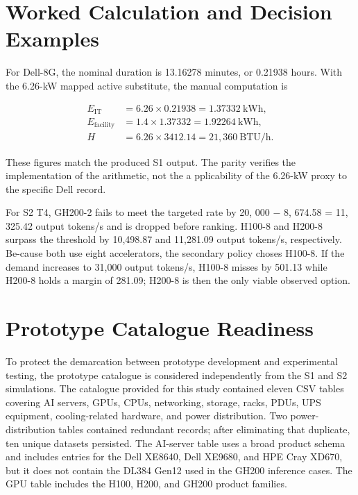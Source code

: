 \documentclass[final,3p,12pt,nopreprintline]{elsarticle}
\begin{document}
\section{Worked Calculation and Decision Examples}


For Dell-8G, the nominal duration is 13.16278 minutes, or 0.21938 hours. With the 6.26-kW mapped active substitute, the manual computation is


\begin{align}
E_{\mathrm{IT}} &= 6.26\times0.21938=1.37332~\mathrm{kWh},\\
E_{\mathrm{facility}} &= 1.4\times1.37332=1.92264~\mathrm{kWh},\\
H &= 6.26\times3412.14=21,360~\mathrm{BTU/h}.
\end{align}

These figures match the produced S1 output. The parity verifies the implementation of the arithmetic, not the a pplicability of the 6.26-kW proxy to the specific Dell record.


For S2 T4, GH200-2 fails to meet the targeted rate by 20, 000 \ensuremath{-} 8, 674.58 = 11, 325.42 output tokens/s and is dropped before ranking. H100-8 and H200-8 surpass the threshold by 10,498.87 and 11,281.09 output tokens/s, respectively. Be-cause both use eight accelerators, the secondary policy choses H100-8. If the demand increases to 31,000 output tokens/s, H100-8 misses by 501.13 while H200-8 holds a margin of 281.09; H200-8 is then the only viable observed option.


\section{Prototype Catalogue Readiness}


To protect the demarcation between prototype development and experimental testing, the prototype catalogue is considered independently from the S1 and S2 simulations. The catalogue provided for this study contained eleven CSV tables covering AI servers, GPUs, CPUs, networking, storage, racks, PDUs, UPS equipment, cooling-related hardware, and power distribution. Two power-distribution tables contained redundant records; after eliminating that duplicate, ten unique datasets persisted. The AI-server table uses a broad product schema and includes entries for the Dell XE8640, Dell XE9680, and HPE Cray XD670, but it does not contain the DL384 Gen12 used in the GH200 inference cases. The GPU table includes the H100, H200, and GH200 product families.
\end{document}
